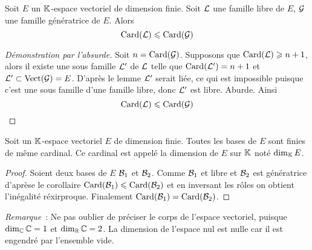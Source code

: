 \begin{cor}
  Soit $E$ un $\mathbb{K}$-espace vectoriel de dimension finie. Soit $\mathcal{L}$ une famille libre de $E$, $\mathcal{G}$ une famille génératrice de $E$. Alors
  \begin{equation}
    \operatorname{Card}(\mathcal{L}) \leqslant \operatorname{Card}(\mathcal{G})
  \end{equation}
\end{cor}
\begin{proof}[Démonstration par l'absurde]
  Soit $n = \operatorname{Card}(\mathcal{G})$. Supposons que $\operatorname{Card}(\mathcal{L}) \geqslant n+1$, alors il existe une sous famille $\mathcal{L}'$ de $\mathcal{L}$ telle que $\operatorname{Card}(\mathcal{L}')=n+1$ et $\mathcal{L}' \subset \operatorname{Vect}(\mathcal{G})=E$. D'après le lemme $\mathcal{L}'$ serait liée, ce qui est impossible puisque c'est une sous famille d'une famille libre, donc $\mathcal{L}'$ est libre. Aburde.  Ainsi 
  \begin{equation}
    \operatorname{Card}(\mathcal{L}) \leqslant \operatorname{Card}(\mathcal{G})
  \end{equation}
\end{proof}

\begin{theo}
  Soit un $\mathbb{K}$-espace vectoriel $E$ de dimension finie. Toutes les bases de $E$ sont finies de même cardinal. Ce cardinal est appelé la dimension de $E$ sur $\mathbb{K}$ noté $\operatorname{dim}_{\mathbb{K}} E$.
\end{theo}
\begin{proof}
  Soient deux bases de $E$ $\mathcal{B}_1$ et $\mathcal{B}_2$. Comme $\mathcal{B}_1$ et libre et $\mathcal{B}_2$ est génératrice d'aprèse le corollaire $\operatorname{Card}(\mathcal{B}_1) \leqslant \operatorname{Card}(\mathcal{B}_2)$ et en inversant les rôles on obtient l'inégalité réxirproque. Finalement $\operatorname{Card}(\mathcal{B}_1)=\operatorname{Card}(\mathcal{B}_2)$.
\end{proof}

\emph{Remarque}~: Ne pas oublier de préciser le corps de l'espace vectoriel, puisque $\operatorname{dim}_{\mathbb{C}} \mathbb{C}=1$ et $\operatorname{dim}_{\mathbb{R}} \mathbb{C}=2$. La dimension de l'espace nul est nulle car il est engendré par l'ensemble vide.

